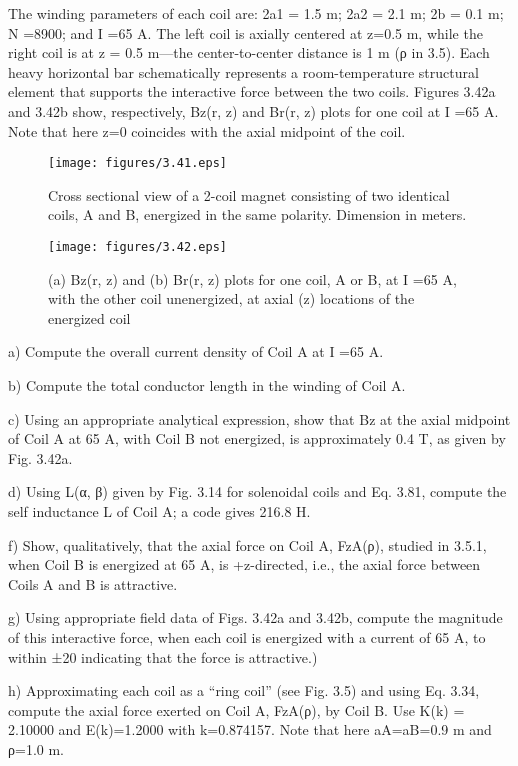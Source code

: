 The winding parameters of each coil are: 2a1 = 1.5 m; 2a2 = 2.1 m; 2b = 0.1 m;
N =8900; and I =65 A. The left coil is axially centered at z=0.5 m, while the right
coil is at z = 0.5 m—the center-to-center distance is 1 m (ρ in 3.5). Each heavy
horizontal bar schematically represents a room-temperature structural element
that supports the interactive force between the two coils.
Figures 3.42a and 3.42b show, respectively, Bz(r, z) and Br(r, z) plots for one coil
at I =65 A. Note that here z=0 coincides with the axial midpoint of the coil.
\begin{figure}[htbp]
	\centering
	\texttt{[image: figures/3.41.eps]}
	\caption{Cross sectional view of a 2-coil magnet consisting of two identical coils,
		A and B, energized in the same polarity. Dimension in meters.}
\end{figure}

\begin{figure}[htbp]
	\centering
	\texttt{[image: figures/3.42.eps]}
	\caption{(a) Bz(r, z) and (b) Br(r, z) plots for one coil, A or B, at I =65 A,
		with the other coil unenergized, at axial (z) locations of the energized coil}
\end{figure}

a) Compute the overall current density of Coil A at I =65 A.

b) Compute the total conductor length in the winding of Coil A.

c) Using an appropriate analytical expression, show that Bz at the axial midpoint of Coil A at 65 A, with Coil B not energized, is approximately 0.4 T, as
given by Fig. 3.42a.

d) Using L(α, β) given by Fig. 3.14 for solenoidal coils and Eq. 3.81, compute
the self inductance L of Coil A; a code gives 216.8 H.

f) Show, qualitatively, that the axial force on Coil A, FzA(ρ), studied in 3.5.1,
when Coil B is energized at 65 A, is +z-directed, i.e., the axial force between
Coils A and B is attractive.

g) Using appropriate field data of Figs. 3.42a and 3.42b, compute the magnitude
of this interactive force, when each coil is energized with a current of 65 A,
to within ±20%
indicating that the force is attractive.)

h) Approximating each coil as a “ring coil” (see Fig. 3.5) and using Eq. 3.34,
compute the axial force exerted on Coil A, FzA(ρ), by Coil B. Use K(k) =
2.10000 and E(k)=1.2000 with k=0.874157. Note that here aA=aB=0.9 m
and ρ=1.0 m.

